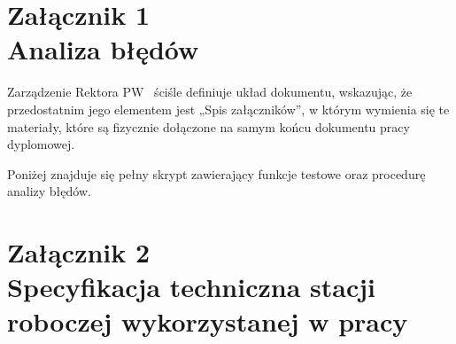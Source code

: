 \documentclass[11pt, a4paper, twoside]{report}
\begin{document}
\clearpage\thispagestyle{empty}\mbox{}\clearpage



\appendix
\setcounter{chapter}{0} %
\renewcommand{\appendixname}{Załącznik}

\renewcommand{\thechapter}{\arabic{chapter}}


\chapter*{Załącznik 1\\Analiza błędów}

\label{zal:analiza_bledow} 


Zarządzenie Rektora PW~ ściśle definiuje układ dokumentu, wskazując, że przedostatnim jego elementem jest „Spis załączników”, w którym  wymienia się te materiały, które są fizycznie dołączone na samym końcu dokumentu pracy dyplomowej.

Poniżej znajduje się pełny skrypt zawierający funkcje testowe oraz procedurę analizy błędów.

\clearpage\thispagestyle{empty}\mbox{}\clearpage


\chapter*{Załącznik 2\\Specyfikacja techniczna stacji roboczej wykorzystanej w pracy}
\label{zal:specyfikacja} %
\end{document}
